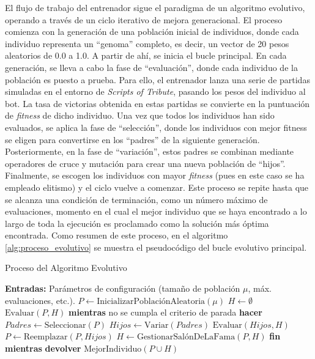 El flujo de trabajo del entrenador sigue el paradigma de un algoritmo evolutivo, operando a través de un ciclo iterativo de mejora generacional. El proceso comienza con la generación de una población inicial de individuos, donde cada individuo representa un ``genoma'' completo, es decir, un vector de 20 pesos aleatorios de 0.0 a 1.0. A partir de ahí, se inicia el bucle principal. En cada generación, se lleva a cabo la fase de ``evaluación'', donde cada individuo de la población es puesto a prueba. Para ello, el entrenador lanza una serie de partidas simuladas en el entorno de \textit{Scripts of Tribute}, pasando los pesos del individuo al bot. La tasa de victorias obtenida en estas partidas se convierte en la puntuación de \textit{fitness} de dicho individuo. Una vez que todos los individuos han sido evaluados, se aplica la fase de ``selección'', donde los individuos con mejor fitness se eligen para convertirse en los ``padres'' de la siguiente generación. Posteriormente, en la fase de ``variación'', estos padres se combinan mediante operadores de cruce y mutación para crear una nueva población de ``hijos''. Finalmente, se escogen los individuos con mayor \textit{fitness} (pues en este caso se ha empleado elitismo) y el ciclo vuelve a comenzar. Este proceso se repite hasta que se alcanza una condición de terminación, como un número máximo de evaluaciones, momento en el cual el mejor individuo que se haya encontrado a lo largo de toda la ejecución es proclamado como la solución más óptima encontrada. Como resumen de este proceso, en el algoritmo \ref{alg:proceso_evolutivo} se muestra el pseudocódigo del bucle evolutivo principal.

\begin{algorithm}[H]
	\caption{Proceso del Algoritmo Evolutivo}
	\label{alg:proceso_evolutivo}
	\begin{algorithmic}[1]
		\State {}
		\State \textbf{Entradas:} Parámetros de configuración (tamaño de población $\mu$, máx. evaluaciones, etc.).
		\State
		\State $P \leftarrow \text{InicializarPoblaciónAleatoria}(\mu)$
		\State $H \leftarrow \emptyset$ 
		\State $\text{Evaluar}(P, H)$
		\State
		\State \textbf{mientras} no se cumpla el criterio de parada \textbf{hacer}
		\State \quad $Padres \leftarrow \text{Seleccionar}(P)$
		\State \quad $Hijos \leftarrow \text{Variar}(Padres)$
		\State \quad $\text{Evaluar}(Hijos, H)$
		\State \quad $P \leftarrow \text{Reemplazar}(P, Hijos)$
		\State \quad $H \leftarrow \text{GestionarSalónDeLaFama}(P, H)$ 
		\State \textbf{fin mientras}
		\State
		\State \textbf{devolver} $\text{MejorIndividuo}(P \cup H)$
	\end{algorithmic}
\end{algorithm}


